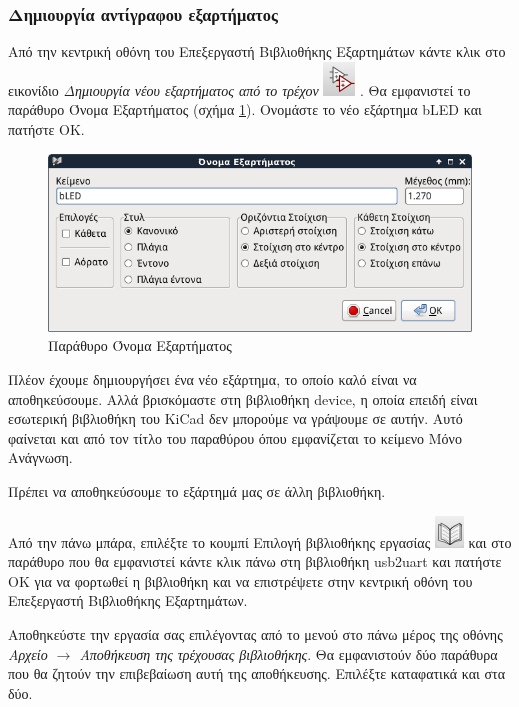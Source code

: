 \documentclass[a4paper]{article}
\begin{document}
\subsubsection{Δημιουργία αντίγραφου εξαρτήματος}

Από την κεντρική οθόνη του Επεξεργαστή Βιβλιοθήκης Εξαρτημάτων κάντε κλικ στο εικονίδιο \textit{Δημιουργία νέου εξαρτήματος από το τρέχον} \includegraphics[scale=.5]{img/libed-ico-copycomp.png}
. Θα εμφανιστεί το παράθυρο Όνομα Εξαρτήματος (σχήμα \ref{fig:libed-dial-compname}). Ονομάστε το νέο εξάρτημα bLED και πατήστε ΟΚ.

\begin{figure}
  \begin{center}
    \includegraphics[width=.5\textwidth]{img/libed-dial-compname.png}
    \caption{Παράθυρο Όνομα Εξαρτήματος}
    \label{fig:libed-dial-compname}
  \end{center}
\end{figure}

Πλέον έχουμε δημιουργήσει ένα νέο εξάρτημα, το οποίο καλό είναι να αποθηκεύσουμε. Αλλά βρισκόμαστε στη βιβλιοθήκη device, η οποία επειδή είναι εσωτερική βιβλιοθήκη του \textenglish{KiCad} δεν μπορούμε να γράψουμε σε αυτήν. Αυτό φαίνεται και από τον τίτλο του παραθύρου όπου εμφανίζεται το κείμενο Μόνο Ανάγνωση.

Πρέπει να αποθηκεύσουμε το εξάρτημά μας σε άλλη βιβλιοθήκη.

Από την πάνω μπάρα, επιλέξτε το κουμπί Επιλογή βιβλιοθήκης εργασίας \includegraphics[scale=.5]{img/libed-ico-selnewlib.png}
και στο παράθυρο που θα εμφανιστεί κάντε κλικ πάνω στη βιβλιοθήκη usb2uart και πατήστε ΟΚ για να φορτωθεί η βιβλιοθήκη και να επιστρέψετε στην κεντρική οθόνη του Επεξεργαστή Βιβλιοθήκης Εξαρτημάτων.

Αποθηκεύστε την εργασία σας επιλέγοντας από το μενού στο πάνω μέρος της οθόνης \textit{Αρχείο $\rightarrow$ Αποθήκευση της τρέχουσας βιβλιοθήκης}. Θα εμφανιστούν δύο παράθυρα που θα ζητούν την επιβεβαίωση αυτή της αποθήκευσης. Επιλέξτε καταφατικά και στα δύο.
\end{document}
